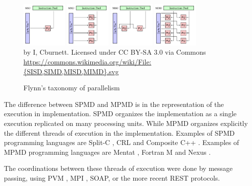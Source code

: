 \begin{figure}
\begin{center}
\includegraphics[width=0.2\textwidth]{../ressources/SISD.pdf}
\includegraphics[width=0.2\textwidth]{../ressources/SIMD.pdf}
\includegraphics[width=0.2\textwidth]{../ressources/MISD.pdf}
\includegraphics[width=0.2\textwidth]{../ressources/MIMD.pdf}\\
by I, Cburnett. Licensed under CC BY-SA 3.0 via Commons
\url{https://commons.wikimedia.org/wiki/File:{SISD,SIMD,MISD,MIMD}.svg}
\end{center}
\caption{Flynn's taxonomy of parallelism}
\label{fig:flynn-taxonomy}
\end{figure}


The difference between SPMD and MPMD is in the representation of the execution in implementation.
SPMD organizes the implementation as a single execution replicated on many processing units.
While MPMD organizes explicitly the different threads of execution in the implementation.
Examples of SPMD programming languages are
Split-C \cite{Culler},
CRL \cite{Johnson1995} and
Composite C++ \cite{K.ManiChandy2005}.
%
Examples of MPMD programming languages are
Mentat \cite{Grimshaw1991},
Fortran M \cite{Foster1995b} and
Nexus \cite{Foster1996}.

The coordinations between these threads of execution were done by message passing, using PVM \cite{Sunderam1994}, MPI \cite{Snir1996,Walker1996}, SOAP, or the more recent REST protocols.

